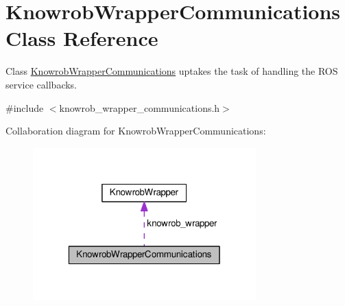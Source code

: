 \hypertarget{classKnowrobWrapperCommunications}{\section{Knowrob\-Wrapper\-Communications Class Reference}
\label{classKnowrobWrapperCommunications}
}


Class \hyperlink{classKnowrobWrapperCommunications}{Knowrob\-Wrapper\-Communications} uptakes the task of handling the R\-O\-S service callbacks.  




{\ttfamily \#include $<$knowrob\-\_\-wrapper\-\_\-communications.\-h$>$}



Collaboration diagram for Knowrob\-Wrapper\-Communications\-:
\nopagebreak
\begin{figure}[H]
\begin{center}
\leavevmode
\includegraphics[width=244pt]{classKnowrobWrapperCommunications__coll__graph}
\end{center}
\end{figure}
